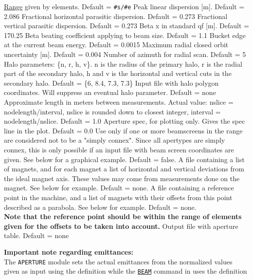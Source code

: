 \begin{5.02.05}
\begin{madlist}
	 \hyperref[sec:range]{Range} given by
	elements. Default = {\tt \#s/\#e}  
	 Peak linear dispersion [m]. Default = 2.086 
	 Fractional horizontal parasitic dispersion. Default = 0.273 
	 Fractional vertical parasitic dispersion. Default = 0.273 
	 Beta x in standard qf [m]. Default = 170.25 
	 Beta beating coefficient applying to beam size. Default = 1.1 
	 Bucket edge at the current beam energy. Default = 0.0015 
	 Maximum radial closed orbit uncertainty [m]. Default = 0.004 
	 Number of azimuth for radial scan. Default = 5 
	 Halo parameters: \{n, r, h, v\}. n is the radius of the
	primary halo,  r is the radial part of the secondary halo, h and v
	is the horizontal and  vertical cuts in the secondary halo. Default
	= \{6, 8.4, 7.3, 7.3\}  
	 Input file with halo polygon coordinates. Will
	suppress  an eventual halo parameter. Default = none  
	 Approximate length in meters between
	measurements. Actual value:  nslice = nodelength/interval, nslice
	is rounded down to closest integer,  interval =
	nodelength/nslice. Default = 1.0  
	 Aperture spec, for plotting only. Gives the spec line in
	the plot. Default = 0.0  
	 Use only if one or more beamscreens in the range are
	considered not to  be a "simply connex". Since all \madx apertypes
	are simply connex, this is only possible  if an input file with
	beam screen coordinates are given. See below for a graphical
	example. Default = false.  
	 A file containing a list of magnets, and for each
	magnet a list of horizontal and vertical deviations from the ideal
	magnet axis. These values may come from measurements done on the
	magnet. See below for example. Default = none.  
	 A file containing a reference point in the machine,
	and a list of magnets with their offsets from this point described
	as a parabola. See below for example. Default = none. \\
	{\bf Note that the reference point should be within the range of
	elements given for the offsets to be taken into account.}
	 Output file with aperture table. Default = none 
	\end{madlist}
\end{5.02.05}

\begin{5.02.04}
{\bf Important note regarding emittances:}\\
The {\tt APERTURE} module sets the actual emittances from the normalized values
given as input using the definition 
while the \hyperref[chap:beam]{\tt BEAM} command in \madx uses the definition 
\end{5.02.04}

